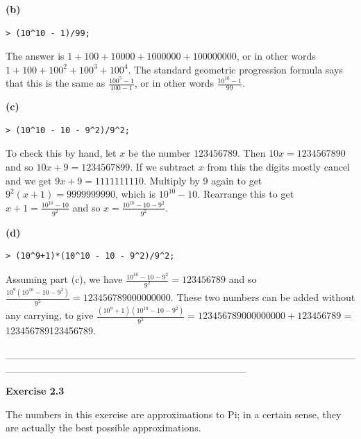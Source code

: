 \documentclass{article}
\begin{document}
\begin{Maple Normal}
\textbf{(b)}
\end{Maple Normal}
\begin{lstlisting}
> (10^10 - 1)/99;
\end{lstlisting}
\begin{Maple Normal}
The answer is 
$ 1+100+10000+1000000+100000000 $, or in other words 
$ 1+100+100^{2}+100^{3}+100^{4} $.  The standard geometric progression formula says that this is the same as 
$ \frac{100^{5}-1}{100-1} $, or in other words 
$ \frac{10^{10}-1}{99} $.
\end{Maple Normal}
\begin{Maple Normal}
\textbf{(c)}
\end{Maple Normal}
\begin{lstlisting}
> (10^10 - 10 - 9^2)/9^2;
\end{lstlisting}
\begin{Maple Normal}
To check this by hand, let 
$ x  $ be the number 
$ 123456789 $.  Then 
$ 10 x =1234567890 $ and so 
$ 10 x +9=1234567899 $.  If we subtract 
$ x  $ from this the digits mostly cancel and we get 
$ 9 x +9=1111111110 $.  Multiply by 9 again to get 
$ 9^{2} (x +1)=9999999990 $, which is 
$ 10^{10}-10 $.  Rearrange this to get 
$ x +1=\frac{10^{10}-10}{9^{2}} $ and so 
$ x =\frac{10^{10}-10-9^{2}}{9^{2}} $.
\end{Maple Normal}
\begin{Maple Normal}
\textbf{(d)}
\end{Maple Normal}
\begin{lstlisting}
> (10^9+1)*(10^10 - 10 - 9^2)/9^2;
\end{lstlisting}
\begin{Maple Normal}
Assuming part (c), we have 
$ \frac{10^{10}-10-9^{2}}{9^{2}}=123456789 $ and so 
$ \frac{10^{9} (10^{10}-10-9^{2})}{9^{2}}=123456789000000000 $.  These two numbers can be added without any carrying, to give
$ \frac{(10^{9}+1) (10^{10}-10-9^{2})}{9^{2}}=123456789000000000+123456789 $ = 123456789123456789.
\end{Maple Normal}
\begin{Maple Normal}
\_\_\_\_\_\_\_\_\_\_\_\_\_\_\_\_\_\_\_\_\_\_\_\_\_\_\_\_\_\_\_\_\_\_\_\_\_\_\_\_\_\_\_\_\_\_\_\_\_\_\_\_\_\_\_\_\_\_\_\_\_\_\_\_\_\_\_\_\_\_\_\_\_\_\_\_\_\_\_\_\_
\end{Maple Normal}
\begin{Maple Heading 2}
\textbf{Exercise 2.3}
\end{Maple Heading 2}
\begin{Maple Normal}
The numbers in this exercise are approximations to 
$ \mathrm{Pi} $; in a certain sense, they are actually the best possible approximations.
\end{Maple Normal}
\end{document}
